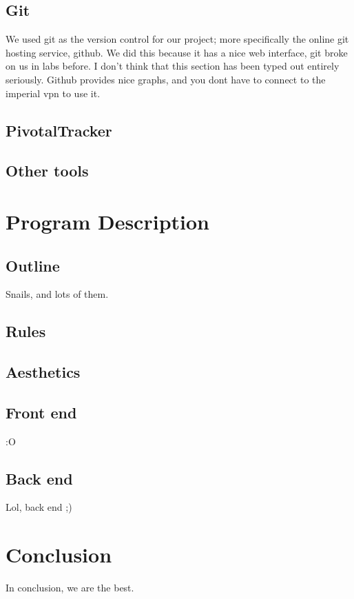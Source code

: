 \documentclass{article}
\begin{document}
\subsection{Git}
We used git as the version control for our project; more specifically the online git hosting service, github. We did this because it has a nice web interface, git broke on us in labs before. I don't think that this section has been typed out entirely seriously. Github provides nice graphs, and you dont have to connect to the imperial vpn to use it.
\subsection{PivotalTracker}
\subsection{Other tools}

\section{Program Description}
\subsection{Outline}
Snails, and lots of them.
\subsection{Rules}
\subsection{Aesthetics}
\subsection{Front end}
:O
\subsection{Back end}
Lol, back end ;)

\section{Conclusion}
In conclusion, we are the best.
\end{document}
